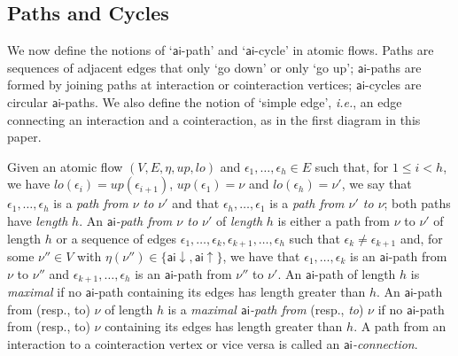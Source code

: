 \documentclass[a4paper]{LMCS}
\begin{document}
\subsection{Paths and Cycles}

We now define the notions of `${\mathsf{ai}}$-path' and `${\mathsf{ai}}$-cycle' in atomic flows. Paths are sequences of adjacent edges that only `go down' or only `go up'; ${\mathsf{ai}}$-paths are formed by joining paths at interaction or cointeraction vertices; ${\mathsf{ai}}$-cycles are circular ${\mathsf{ai}}$-paths. We also define the notion of `simple edge', \emph{i.e.}, an edge connecting an interaction and a cointeraction, as in the first diagram in this paper.

\begin{defi}
Given an atomic flow $(V,E,\eta,{{\mathit up}},{{\mathit lo}})$ and $\epsilon_1,\dots,\epsilon_h\in E$ such that, for $1\le i<h$, we have ${{\mathit lo}}(\epsilon_i)={{\mathit up}}(\epsilon_{i+1})$, ${{\mathit up}}(\epsilon_1)=\nu$ and ${{\mathit lo}}(\epsilon_h)=\nu'$, we say that $\epsilon_1,\dots,\epsilon_h$ is a \emph{path from $\nu$ to $\nu'$} and that $\epsilon_h,\dots,\epsilon_1$ is a \emph{path from $\nu'$ to $\nu$}; both paths have \emph{length} $h$. An \emph{${\mathsf{ai}}$-path from $\nu$ to $\nu'$} of \emph{length} $h$ is either a path from $\nu$ to $\nu'$ of length $h$ or a sequence of edges $\epsilon_1,\dots,\epsilon_k,\epsilon_{k+1},\dots,\epsilon_h$ such that $\epsilon_k \ne \epsilon_{k+1}$ and, for some $\nu''\in V$ with $\eta(\nu'')\in\{{{{\mathsf{ai}}{\downarrow}}},{{{\mathsf{ai}}{\uparrow}}}\}$, we have that $\epsilon_1,\dots,\epsilon_k$ is an ${\mathsf{ai}}$-path from $\nu$ to $\nu''$ and $\epsilon_{k+1},\dots,\epsilon_h$ is an ${\mathsf{ai}}$-path from $\nu''$ to $\nu'$. An ${\mathsf{ai}}$-path of length $h$ is \emph{maximal} if no ${\mathsf{ai}}$-path containing its edges has length greater than $h$. An ${\mathsf{ai}}$-path from (resp., to) $\nu$ of length $h$ is a \emph{maximal\/ ${\mathsf{ai}}$-path from} (resp., \emph{to}) $\nu$ if no ${\mathsf{ai}}$-path from (resp., to) $\nu$ containing its edges has length greater than $h$. A path from an interaction to a cointeraction vertex or vice versa is called an \emph{${\mathsf{ai}}$-connection}.
\end{defi}
\end{document}
